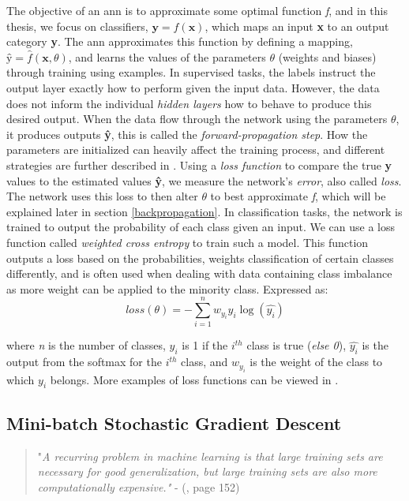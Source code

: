     The objective of an \gls{ann} is to approximate some optimal function \textit{f}, and in this thesis, we focus on classifiers, $\textbf{y} = f(\textbf{x})$, which maps an input \textbf{x} to an output category \textbf{y}. The \gls{ann} approximates this function by defining a mapping, $\textbf{\^{y}} = \hat{f}(\textbf{x},\theta)$, and learns the values of the parameters \textit{$\theta$} (weights and biases) through training using examples. In supervised tasks, the labels instruct the output layer exactly how to perform given the input data. However, the data does not inform the individual \textit{hidden layers} how to behave to produce this desired output. When the data flow through the network using the parameters $\theta$, it produces outputs \textbf{\^{y}}, this is called the \textit{forward-propagation step}. How the parameters are initialized can heavily affect the training process, and different strategies are further described in \citet{Goodfellow-et-al-2016}. Using a \textit{loss function} to compare the true \textbf{y} values to the estimated values \textbf{\^{y}}, we measure the network's \textit{error}, also called \textit{loss}. The network uses this loss to then alter $\theta$ to best approximate \textit{f}, which will be explained later in section \ref{backpropagation}. In classification tasks, the network is trained to output the probability of each class given an input\cite{ho2019real_weighted_cross_entropy}. We can use a loss function called \textit{weighted cross entropy} to train such a model. This function outputs a loss based on the probabilities, weights classification of certain classes differently, and is often used when dealing with data containing class imbalance as more weight can be applied to the minority class. Expressed as:
        \begin{equation} \label{cross_entropy}
            loss(\theta) = - \sum^{n}_{i=1} w_{y_{i}}y_{i}\log(\hat{y_{i}})
        \end{equation}
    
    where \textit{n} is the number of classes, $y_{i}$ is 1 if the $i^{th}$ class is true (\textit{else 0}), $\hat{y_{i}}$ is the output from the softmax for the $i^{th}$ class, and $w_{y_{i}}$ is the weight of the class to which $y_{i}$ belongs. More examples of loss functions can be viewed in \citeauthor{mishra2017deep}\cite{mishra2017deep}.
    


\subsection{Mini-batch Stochastic Gradient Descent} \label{batch learning}
        \begin{quote}
        "\textit{A recurring problem in machine learning is that large training sets are necessary for good generalization, but large training sets are also more computationally
        expensive."} - (\citeauthor{Goodfellow-et-al-2016}\citeyear{Goodfellow-et-al-2016}, page 152)
    \end{quote}
    
